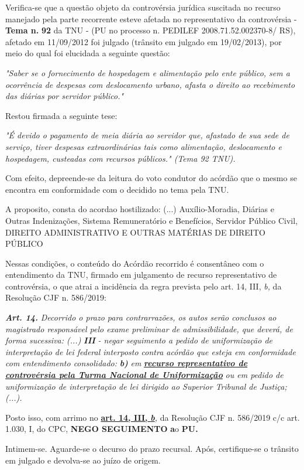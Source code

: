\documentclass[12pt]{article}
\begin{document}
\justifying
\noindent Verifica-se que a questão objeto da controvérsia jurídica suscitada no recurso manejado pela parte recorrente esteve afetada no representativo da controvérsia - \textbf{Tema n. }\textbf{92} da TNU - (PU no processo n. PEDILEF 2008.71.52.002370-8/ RS),  afetado em 11/09/2012 foi julgado (trânsito em julgado em 19/02/2013), por meio do qual foi elucidada a seguinte questão:

\noindent \textit{"Saber se o fornecimento de hospedagem e alimentação pelo ente público, sem a ocorrência de despesas com deslocamento urbano, afasta o direito ao recebimento das diárias por servidor público."}

\noindent Restou firmada a seguinte tese:

\noindent \textit{"É devido o pagamento de meia diária ao servidor que, afastado de sua sede de serviço, tiver despesas extraordinárias tais como alimentação, deslocamento e hospedagem, custeadas com recursos públicos." (Tema 92 TNU).}

\noindent Com efeito, depreende-se da leitura do voto condutor do acórdão que o mesmo se encontra em conformidade com o decidido no  tema pela TNU.

\noindent A proposito, consta do acordao hostilizado: (...) Auxílio-Moradia, Diárias e Outras Indenizações, Sistema Remuneratório e Benefícios, Servidor Público Civil, DIREITO ADMINISTRATIVO E OUTRAS MATÉRIAS DE DIREITO PÚBLICO

\noindent Nessas condições, o conteúdo do Acórdão recorrido é consentâneo com o entendimento da TNU, firmado em julgamento de recurso representativo de controvérsia, o que atrai a incidência da regra prevista pelo art. 14, III, \textit{b,} da Resolução CJF n. 586/2019:

\noindent \textit{\textbf{Art. 14.}}\textit{ Decorrido o prazo para contrarrazões, os autos serão conclusos ao magistrado responsável pelo exame preliminar de admissibilidade, que deverá, de forma sucessiva: (...) }\textit{\textbf{III }}\textit{- negar seguimento a pedido de uniformização de interpretação de lei federal interposto contra acórdão que esteja em conformidade com entendimento consolidado: }\textit{\textbf{b)}}\textit{ em }\uline{\textit{\textbf{recurso representativo de controvérsia pela Turma Nacional de Uniformização}}}\textit{ ou em pedido de uniformização de interpretação de lei dirigido ao Superior Tribunal de Justiça;(...).}

\noindent Posto isso, com arrimo no \uline{\textbf{art. 14, III, }}\uline{\textit{\textbf{b}}}\textit{,} da Resolução CJF n. 586/2019 c/c art. 1.030, I, do CPC, \textbf{NEGO SEGUIMENTO }\textbf{a}o\textbf{ PU}\textbf{.}

\noindent Intimem-se. Aguarde-se o decurso do prazo recursal. Após, certifique-se o trânsito em julgado e devolva-se ao juízo de origem.
\end{document}
